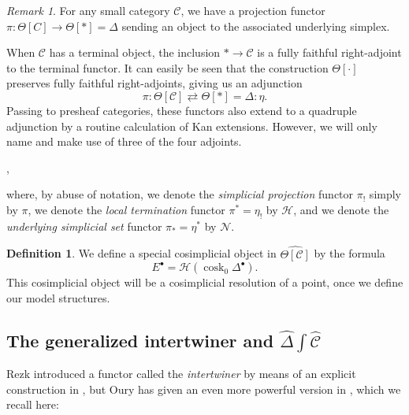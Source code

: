 \documentclass[a4paper]{article}
\numberwithin{equation}{subsection}
\theoremstyle{plain}   %
\theoremstyle{definition}
\newtheorem{defn}[equation]{Definition}
\theoremstyle{remark}
\newtheorem{rem}[equation]{Remark}
\theoremstyle{plain}
\newcommand{\psh}[1]{\ensuremath{\widehat{#1}}}
\providecommand{\C}{}
\renewcommand{\C}{\ensuremath{\mathcal{C}}}
\newcommand{\cellset}{\ensuremath{\widehat{\Theta[\mathcal{C}]}}}
\newcommand{\ssetlab}{\ensuremath{\widehat{\Delta} \int \widehat{\mathcal{C}}}}
\begin{document}
\begin{rem} 
	For any small category \(\C\), we have a projection functor \(\pi:\Theta[C]\to \Theta[\ast]=\Delta\) sending an object to the associated underlying simplex.  
	
	When \(\C\) has a terminal object, the inclusion \(\ast\to \C\) is a fully faithful right-adjoint to the terminal functor.  It can easily be seen that the construction \(\Theta[\cdot]\) preserves fully faithful right-adjoints, giving us an adjunction
	\[
		\pi: \Theta[\C]\rightleftarrows \Theta[\ast]=\Delta: \eta.
	\]
	Passing to presheaf categories, these functors also extend to a quadruple adjunction by a routine calculation of Kan extensions.  However, we will only name and make use of three of the four adjoints.     
	\begin{center}
		,
	\end{center}
	where, by abuse of notation, we denote the \emph{simplicial projection} functor \(\pi_!\) simply by \(\pi\), we denote the \emph{local termination} functor \(\pi^\ast=\eta_!\) by \(\mathscr{H}\), and we denote the \emph{underlying simplicial set} functor \(\pi_\ast=\eta^\ast\) by \(\mathscr{N}\). 
\end{rem}

\begin{defn} We define a special cosimplicial object in \(\cellset\) by the formula \[E^\bullet=\mathscr{H}(\operatorname{cosk}_0\Delta^\bullet).\]  This cosimplicial object will be a cosimplicial resolution of a point, once we define our model structures.
\end{defn}

\subsection{The generalized intertwiner and \(\ssetlab\)}\label{sec:intertwiner}
Rezk introduced a functor called the \emph{intertwiner} by means of an explicit construction in \cite{rezk-theta-n-spaces}, but Oury has given an even more powerful version in \cite{oury}, which we recall here:
\end{document}
